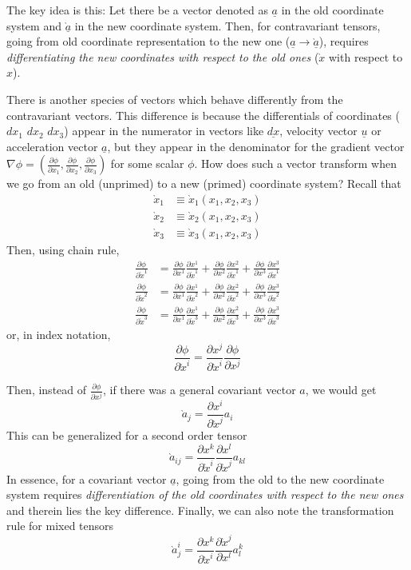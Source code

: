 \documentclass[11pt, letterpaper]{article}
\newcommand{\1}{\bm{1}}
\newcommand{\pd}[2]{\frac{\partial #1}{\partial #2}}
\newcommand{\vect}[1]{\underline{#1}} %
\newcommand{\p}[1]{\grave{#1}} %
\begin{document}
The key idea is this: Let there be a vector denoted as $\vect{a}$ in the old coordinate system and $\vect{\p a}$ in the new coordinate system. Then, for contravariant tensors, going from old coordinate representation to the new one ($\vect{a} \rightarrow \vect{\p a}$), requires \textit{differentiating the new coordinates with respect to the old ones} ($\p x$ with respect to $x$).


There is another species of vectors which behave differently from the contravariant vectors. This difference is because the differentials of coordinates ($dx_1$ $dx_2$ $dx_3$) appear in the numerator in vectors like $\vect{dx}$, velocity vector $\vect{u}$ or acceleration vector $\vect{a}$, but they appear in the denominator for the gradient vector $\nabla \phi = (\pd{\phi}{x_1},\pd{\phi}{x_2},\pd{\phi}{x_3})$ for some scalar $\phi$. How does such a vector transform when we go from an old (unprimed) to a new (primed) coordinate system? Recall that
\begin{align*}
\p x_1 &\equiv \p x_1(x_1, x_2, x_3)\\
\p x_2 &\equiv \p x_2(x_1, x_2, x_3)\\
\p x_3 &\equiv \p x_3(x_1, x_2, x_3)
\end{align*}
Then, using chain rule,
\begin{align*}
\pd{\phi}{\p x^1} &= \pd{\phi}{x^1}\pd{x^1}{\p x^1}+\pd{\phi}{x^2}\pd{x^2}{\p x^1}+\pd{\phi}{x^3}\pd{x^3}{\p x^1}\\
\pd{\phi}{\p x^2} &= \pd{\phi}{x^1}\pd{x^1}{\p x^2}+\pd{\phi}{x^2}\pd{x^2}{\p x^2}+\pd{\phi}{x^3}\pd{x^3}{\p x^2}\\
\pd{\phi}{\p x^3} &= \pd{\phi}{x^1}\pd{x^1}{\p x^3}+\pd{\phi}{x^2}\pd{x^2}{\p x^3}+\pd{\phi}{x^3}\pd{x^3}{\p x^3}
\end{align*}
or, in index notation,
$$
\pd{\phi}{\p x^i} = \pd{x^j}{\p x^i}\pd{\phi}{x^j}
$$

Then, instead of $\pd{\phi}{x^j}$, if there was a general covariant vector $a$, we would get
$$
\p a_j = \pd{x^i}{\p x^j} a_i
$$
This can be generalized for a second order tensor 
$$
\p a_{ij} = \pd{x^k}{\p x^i}\pd{x^l}{\p x^j} a_{kl}
$$
In essence, for a covariant vector $\vect{a}$, going from the old to the new coordinate system requires \textit{differentiation of the old coordinates with respect to the new ones} and therein lies the key difference. Finally, we can also note the transformation rule for mixed tensors
$$
\grave{a}^{i}_j = \pd{x^k}{\grave{x}^i}\pd{\grave{x}^j}{x^l} a^{k}_l
$$
\end{document}

